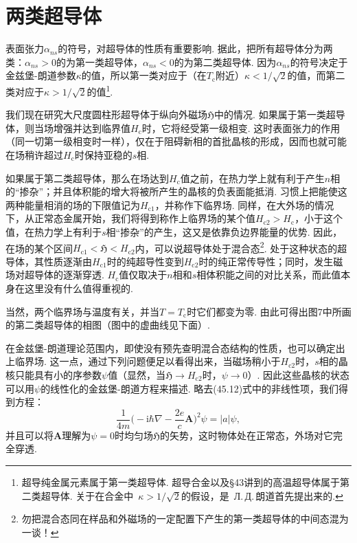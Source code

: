 \section{两类超导体}

表面张力$\alpha_{ns}$的符号，对超导体的性质有重要影响. 据此，把所有超导体分为两类：$\alpha_{ns}>0$的为第一类超导体，$\alpha_{ns}<0$的为第二类超导体. 因为$\alpha_{ns}$的符号决定于金兹堡-朗道参数$\kappa$的值，所以第一类对应于（在$T_{\mathrm{c}}$附近）$\kappa<1/\sqrt{2}$的值，而第二类对应于$\kappa>1/\sqrt{2}$的值\footnote{超导纯金属元素属于第一类超导体. 超导合金以及§43讲到的高温超导体属于第二类超导体. 关于在合金中~$\kappa>1/\sqrt{2}$的假设，是~Л.\,Д.\,朗道首先提出来的.}.

我们现在研究大尺度圆柱形超导体于纵向外磁场$\mathfrak{H}$中的情况. 如果属于第一类超导体，则当场增强并达到临界值$H_{\mathrm{c}}$时，它将经受第一级相变. 这时表面张力的作用（同一切第一级相变时一样），仅在于阻碍新相的首批晶核的形成，因而也就可能在场稍许超过$H_{\mathrm{c}}$时保持亚稳的$s$相.

如果属于第二类超导体，那么在场达到$H_{\mathrm{c}}$值之前，在热力学上就有利于产生$n$相的“掺杂”；并且体积能的增大将被所产生的晶核的负表面能抵消. 习惯上把能使这两种能量相消的场的下限值记为$H_{\mathrm{c}1}$，并称作下临界场. 同样，在大外场的情况下，从正常态金属开始，我们将得到称作上临界场的某个值$H_{\mathrm{c}2}>H_{\mathrm{c}}$，小于这个值，在热力学上有利于$s$相“掺杂”的产生，这又是依靠负边界能量的优势. 因此，在场的某个区间$H_{\mathrm{c}1}<\mathfrak{H}<H_{\mathrm{c}2}$内，可以说超导体处于混合态\footnote{勿把混合态同在样品和外磁场的一定配置下产生的第一类超导体的中间态混为一谈！}. 处于这种状态的超导体，其性质逐渐由$H_{\mathrm{c}1}$时的纯超导性变到$H_{\mathrm{c}2}$时的纯正常传导性；同时，发生磁场对超导体的逐渐穿透. $H_{\mathrm{c}}$值仅取决于$n$相和$s$相体积能之间的对比关系，而此值本身在这里没有什么值得重视的.

当然，两个临界场与温度有关，并当$T=T_{\mathrm{c}}$时它们都变为零. 由此可得出图7中所画的第二类超导体的相图（图中的虚曲线见下面）.

在金兹堡-朗道理论范围内，即使没有预先查明混合态结构的性质，也可以确定出上临界场. 这一点，通过下列问题便足以看得出来，当磁场稍小于$H_{\mathrm{c}2}$时，$s$相的晶核只能具有小的序参数$\psi$值（显然，当$\mathfrak{H}\to H_{\mathrm{c}2}$时，$\psi\to0$）. 因此这些晶核的状态可以用$\psi$的线性化的金兹堡-朗道方程来描述. 略去(45.12)式中的非线性项，我们得到方程：
\begin{equation}
\frac{1}{4m}\biggl(-\mathrm{i}\hbar\nabla-\frac{2e}{c}\bm{A}\biggr)^{\!2}\psi=|a|\psi,
\end{equation}
并且可以将$\bm{A}$理解为$\psi=0$时均匀场$\mathfrak{H}$的矢势，这时物体处在正常态，外场对它完全穿透.

